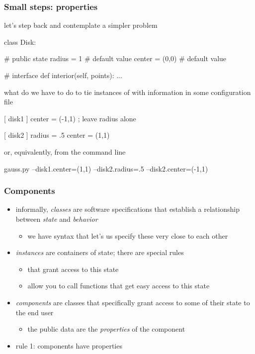 \begin{frame}[fragile]
%
  \frametitle{Small steps: properties}
%
  let's step back and contemplate a simpler problem
%
  \begin{ipython}{}
class Disk:

    # public state
    radius = 1     # default value
    center = (0,0) # default value

    # interface
    def interior(self, points):
        ...
  \end{ipython}
%
  what do we have to do to tie instances of  with information in some configuration
  file
%
  \begin{icfg}{}
    [ disk1 ]
    center = (-1,1)   ; leave {radius} alone

    [ disk2 ]
    radius = .5
    center = (1,1)
  \end{icfg}
%
  or, equivalently, from the command line
%
  \begin{ish}{}
gauss.py --disk1.center=(1,1) --disk2.radius=.5 --disk2.center=(-1,1)
  \end{ish}
%
\end{frame}

\begin{frame}[fragile]
%
  \frametitle{Components}
%
  \begin{itemize}
%
  \item informally, \emph{classes} are software specifications that establish a relationship
    between \emph{state} and \emph{behavior}
    \begin{itemize}
    \item we have syntax that let's us specify these very close to each other
    \end{itemize}
%
  \item \emph{instances} are containers of state; there are special rules
    \begin{itemize}
    \item that grant access to this state
    \item allow you to call functions that get easy access to this state
    \end{itemize}
%
  \item \emph{components} are classes that specifically grant access to some of their state to
    the end user
    \begin{itemize}
    \item the public data are the \emph{properties} of the component
    \end{itemize}
%
  \item rule 1: components have properties
%
  \end{itemize}
%
\end{frame}

